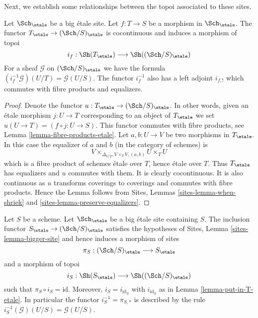\noindent
Next, we establish some relationships between the topoi
associated to these sites.

\begin{lemma}
\label{lemma-put-in-T-etale}
Let $\Sch_\etale$ be a big \'etale site.
Let $f : T \to S$ be a morphism in $\Sch_\etale$.
The functor $T_\etale \to (\Sch/S)_\etale$
is cocontinuous and induces a morphism of topoi
$$
i_f :
\Sh(T_\etale)
\longrightarrow
\Sh((\Sch/S)_\etale)
$$
For a sheaf $\mathcal{G}$ on $(\Sch/S)_\etale$
we have the formula $(i_f^{-1}\mathcal{G})(U/T) = \mathcal{G}(U/S)$.
The functor $i_f^{-1}$ also has a left adjoint $i_{f, !}$ which commutes
with fibre products and equalizers.
\end{lemma}

\begin{proof}
Denote the functor $u : T_\etale \to (\Sch/S)_\etale$.
In other words, given an \'etale morphism $j : U \to T$ corresponding
to an object of $T_\etale$ we set $u(U \to T) = (f \circ j : U \to S)$.
This functor commutes with fibre products, see
Lemma \ref{lemma-fibre-products-etale}.
Let $a, b : U \to V$ be two morphisms in $T_\etale$.
In this case the equalizer of $a$ and $b$ (in the category of schemes) is
$$
V \times_{\Delta_{V/T}, V \times_T V, (a, b)} U \times_T U
$$
which is a fibre product of schemes \'etale over $T$, hence \'etale
over $T$. Thus $T_\etale$ has equalizers and $u$ commutes with them.
It is clearly cocontinuous.
It is also continuous as $u$ transforms coverings to coverings and
commutes with fibre products. Hence the Lemma follows from
Sites, Lemmas \ref{sites-lemma-when-shriek}
and \ref{sites-lemma-preserve-equalizers}.
\end{proof}

\begin{lemma}
\label{lemma-at-the-bottom-etale}
Let $S$ be a scheme. Let $\Sch_\etale$ be a big \'etale
site containing $S$.
The inclusion functor $S_\etale \to (\Sch/S)_\etale$
satisfies the hypotheses of Sites, Lemma \ref{sites-lemma-bigger-site}
and hence induces a morphism of sites
$$
\pi_S : (\Sch/S)_\etale \longrightarrow S_\etale
$$
and a morphism of topoi
$$
i_S : \Sh(S_\etale) \longrightarrow \Sh((\Sch/S)_\etale)
$$
such that $\pi_S \circ i_S = \text{id}$. Moreover, $i_S = i_{\text{id}_S}$
with $i_{\text{id}_S}$ as in Lemma \ref{lemma-put-in-T-etale}.
In particular the functor $i_S^{-1} = \pi_{S, *}$ is described by the rule
$i_S^{-1}(\mathcal{G})(U/S) = \mathcal{G}(U/S)$.
\end{lemma}

